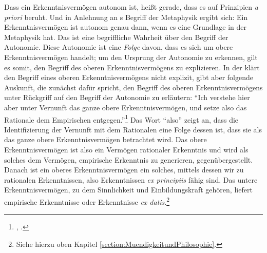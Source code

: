 Dass ein Erkenntnisvermögen autonom ist, heißt gerade, dass es auf Prinzipien
\emph{a priori} beruht. Und in Anlehnung an s Begriff der
Metaphysik ergibt sich: Ein
Erkenntnisvermögen ist autonom genau dann, wenn es eine Grundlage in der
Metaphysik hat. Das ist eine begriffliche Wahrheit über den Begriff der
Autonomie. Diese Autonomie ist eine \emph{Folge} davon, dass es sich um
obere Erkenntnisvermögen handelt; um den Ursprung der Autonomie zu erkennen,
gilt es somit, den Begriff des oberen Erkenntnisvermögens zu explizieren. In der
 klärt  den Begriff eines
oberen Erkenntnisvermögens nicht explizit, gibt aber folgende Auskunft, die
zunächst dafür spricht, den Begriff des oberen Erkenntnisvermögens unter
Rückgriff auf den Begriff der Autonomie zu erläutern:
\enquote{Ich verstehe hier aber unter Vernunft das ganze obere
Erkenntnisvermögen, und setze also das Rationale dem Empirischen
entgegen.}\footnote{\cite[][B 863]{Kant:KritikderreinenVernunft2003},
\cite[][III: 540.27--29]{Kant:GesammelteWerke1900ff.}.}
Das Wort \enquote{also} zeigt an, dass die Identifizierung der Vernunft mit dem
Rationalen eine Folge dessen ist, dass sie als das ganze obere
Erkenntnisvermögen betrachtet wird. Das obere Erkenntnisvermögen ist also ein
Vermögen rationaler Erkenntnis und wird als solches dem Vermögen, empirische
Erkenntnis zu generieren, gegenübergestellt. Danach ist ein oberes
Erkenntnisvermögen ein solches, mittels dessen wir zu rationalen Erkenntnissen,
also Erkenntnissen \emph{ex principiis} fähig sind. Das untere
Erkenntnisvermögen, zu dem Sinnlichkeit und Einbildungskraft gehören, liefert
empirische Erkenntnisse oder Erkenntnisse \emph{ex datis}.\footnote{Siehe hierzu
oben Kapitel \ref{section:MuendigkeitundPhilosophie}.}

